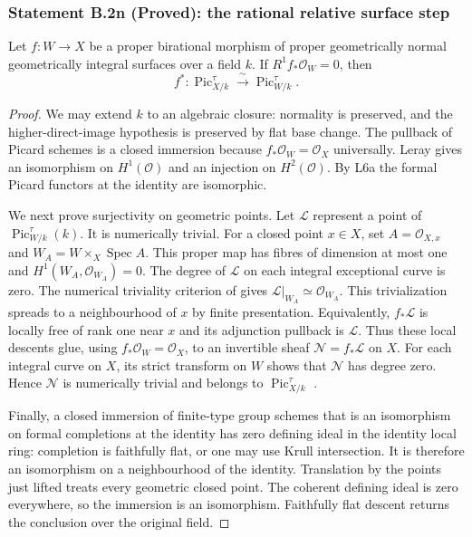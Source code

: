 \subsubsection*{Statement B.2n (Proved): the rational relative surface step}
\begin{proposition}
\label{B:B2-surface-rational-step}
Let $f:W\to X$ be a proper birational morphism of proper
geometrically normal geometrically integral surfaces over a field
$k$.  If $R^1f_*\mathcal O_W=0$, then
\[
 f^*:\operatorname{Pic}^{\tau}_{X/k}
       \xrightarrow{\ \sim\ }\operatorname{Pic}^{\tau}_{W/k}.
\]
\end{proposition}
\begin{proof}
We may extend $k$ to an algebraic closure: normality is preserved,
and the higher-direct-image hypothesis is preserved by flat base
change.  The pullback of Picard schemes is a closed immersion
because $f_*\mathcal O_W=\mathcal O_X$ universally.  Leray gives
an isomorphism on $H^1(\mathcal O)$ and an injection on
$H^2(\mathcal O)$.  By L6a the formal Picard functors at the
identity are isomorphic.

We next prove surjectivity on geometric points.  Let $\mathcal L$
represent a point of $\operatorname{Pic}^{\tau}_{W/k}(k)$.
It is numerically trivial.  For a closed point $x\in X$, set
$A=\mathcal O_{X,x}$ and $W_A=W\times_X\operatorname{Spec}A$.
This proper map has fibres of dimension at most one and
$H^1(W_A,\mathcal O_{W_A})=0$.  The degree of $\mathcal L$
on each integral exceptional curve is zero.  The numerical
triviality criterion of \cite[Theorem 12.1(i), pp.~220--221]
{Lipman1969B} gives
$\mathcal L|_{W_A}\simeq\mathcal O_{W_A}$.
This trivialization spreads to a neighbourhood of $x$ by finite
presentation.  Equivalently, $f_*\mathcal L$ is locally free of
rank one near $x$ and its adjunction pullback is $\mathcal L$.
Thus these local descents glue, using $f_*\mathcal O_W=\mathcal O_X$,
to an invertible sheaf $\mathcal N=f_*\mathcal L$ on $X$.
For each integral curve on $X$, its strict transform on $W$
shows that $\mathcal N$ has degree zero.  Hence $\mathcal N$
is numerically trivial and belongs to $\operatorname{Pic}^{\tau}_{X/k}$
\cite[Theorem 6.3 and Remark 6.19]{Kleiman2005}.

Finally, a closed immersion of finite-type group schemes that
is an isomorphism on formal completions at the identity has
zero defining ideal in the identity local ring: completion is
faithfully flat, or one may use Krull intersection.  It is
therefore an isomorphism on a neighbourhood of the identity.
Translation by the points just lifted treats every geometric
closed point.  The coherent defining ideal is zero everywhere,
so the immersion is an isomorphism.  Faithfully flat descent
returns the conclusion over the original field.
\end{proof}


